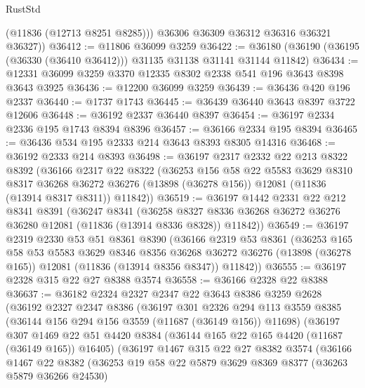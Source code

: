 \begin{lexlean}{RustStd}
\begin{coremodule}
          (@11836 (@12713 @8251 @8285)))
        @36306
        @36309
        @36312
        @36316
        @36321
        @36327))
@36412 := @11806 @36099 @3259
@36422 := @36180 (@36190 (@36195 (@36330 (@36410 @36412))) @31135 @31138 @31141 @31144 @11842)
@36434 := @12331 @36099 @3259 @3370 @12335 @8302 @2338 @541 @196 @3643 @8398 @3643 @3925
@36436 := @12200 @36099 @3259
@36439 := @36436 @420 @196 @2337
@36440 := @1737 @1743
@36445 := @36439 @36440 @3643 @8397 @3722 @12606
@36448 := @36192 @2337 @36440 @8397
@36454 := @36197 @2334 @2336 @195 @1743 @8394 @8396
@36457 := @36166 @2334 @195 @8394
@36465 := @36436 @534 @195 @2333 @214 @3643 @8393 @8305 @14316
@36468 := @36192 @2333 @214 @8393
@36498 := @36197
    @2317
    @2332
    @22
    @213
    @8322
    @8392
    (@36166
      @2317
      @22
      @8322
      (@36253
        @156
        @58
        @22
        @5583
        @3629
        @8310
        @8317
        @36268
        @36272
        @36276
        (@13898 (@36278 @156))
        @12081
        (@11836 (@13914 @8317 @8311))
        @11842))
@36519 := @36197
    @1442
    @2331
    @22
    @212
    @8341
    @8391
    (@36247
      @8341
      (@36258 @8327 @8336 @36268 @36272 @36276 @36280 @12081 (@11836 (@13914 @8336 @8328)) @11842))
@36549 := @36197
    @2319
    @2330
    @53
    @51
    @8361
    @8390
    (@36166
      @2319
      @53
      @8361
      (@36253
        @165
        @58
        @53
        @5583
        @3629
        @8346
        @8356
        @36268
        @36272
        @36276
        (@13898 (@36278 @165))
        @12081
        (@11836 (@13914 @8356 @8347))
        @11842))
@36555 := @36197 @2328 @315 @22 @27 @8388 @3574
@36558 := @36166 @2328 @22 @8388
@36637 := @36182
    @2324
    @2327
    @2347
    @22
    @3643
    @8386
    @3259
    @2628
    (@36192
      @2327
      @2347
      @8386
      (@36197
        @301
        @2326
        @294
        @113
        @3559
        @8385
        (@36144 @156 @294 @156 @3559 (@11687 (@36149 @156)) @11698)
        (@36197
          @307
          @1469
          @22
          @51
          @4420
          @8384
          (@36144 @165 @22 @165 @4420 (@11687 (@36149 @165)) @16405)
          (@36197
            @1467
            @315
            @22
            @27
            @8382
            @3574
            (@36166
              @1467
              @22
              @8382
              (@36253
                @19
                @58
                @22
                @5879
                @3629
                @8369
                @8377
                (@36263 @5879 @36266 @24530)

\end{coremodule}
\end{lexlean}
